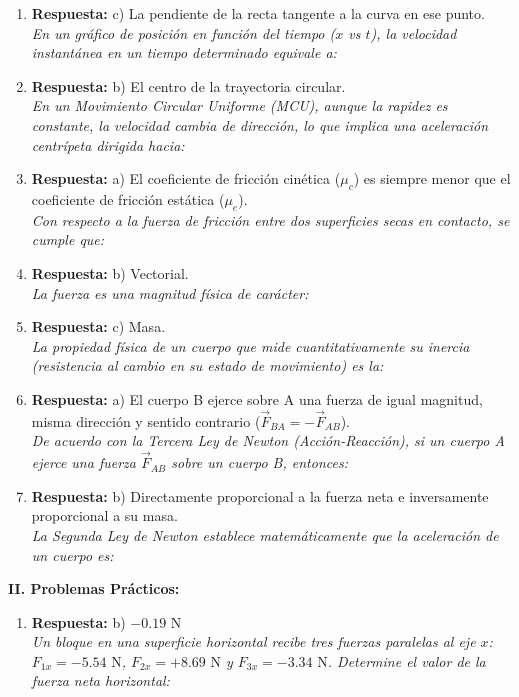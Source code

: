 \documentclass[11pt,a4paper]{article}
\begin{document}
\begin{enumerate}
    \item \textbf{Respuesta:} c) La pendiente de la recta tangente a la curva en ese punto. \\ \textit{En un gráfico de posición en función del tiempo ($x$ vs $t$), la velocidad instantánea en un tiempo determinado equivale a:}
    \item \textbf{Respuesta:} b) El centro de la trayectoria circular. \\ \textit{En un Movimiento Circular Uniforme (MCU), aunque la rapidez es constante, la velocidad cambia de dirección, lo que implica una aceleración centrípeta dirigida hacia:}
    \item \textbf{Respuesta:} a) El coeficiente de fricción cinética ($\mu_c$) es siempre menor que el coeficiente de fricción estática ($\mu_e$). \\ \textit{Con respecto a la fuerza de fricción entre dos superficies secas en contacto, se cumple que:}
    \item \textbf{Respuesta:} b) Vectorial. \\ \textit{La fuerza es una magnitud física de carácter:}
    \item \textbf{Respuesta:} c) Masa. \\ \textit{La propiedad física de un cuerpo que mide cuantitativamente su inercia (resistencia al cambio en su estado de movimiento) es la:}
    \item \textbf{Respuesta:} a) El cuerpo B ejerce sobre A una fuerza de igual magnitud, misma dirección y sentido contrario ($\vec{F}_{BA} = -\vec{F}_{AB}$). \\ \textit{De acuerdo con la Tercera Ley de Newton (Acción-Reacción), si un cuerpo A ejerce una fuerza $\vec{F}_{AB}$ sobre un cuerpo B, entonces:}
    \item \textbf{Respuesta:} b) Directamente proporcional a la fuerza neta e inversamente proporcional a su masa. \\ \textit{La Segunda Ley de Newton establece matemáticamente que la aceleración de un cuerpo es:}
\end{enumerate}\textbf{II. Problemas Prácticos:}\begin{enumerate}    \item \textbf{Respuesta:} b) $-0.19 \text{ N}$ \\
    \textit{Un bloque en una superficie horizontal recibe tres fuerzas paralelas al eje $x$: $F_{1x} = -5.54 \text{ N}$, $F_{2x} = +8.69 \text{ N}$ y $F_{3x} = -3.34 \text{ N}$. Determine el valor de la fuerza neta horizontal:} \\

\end{enumerate}
\end{document}
